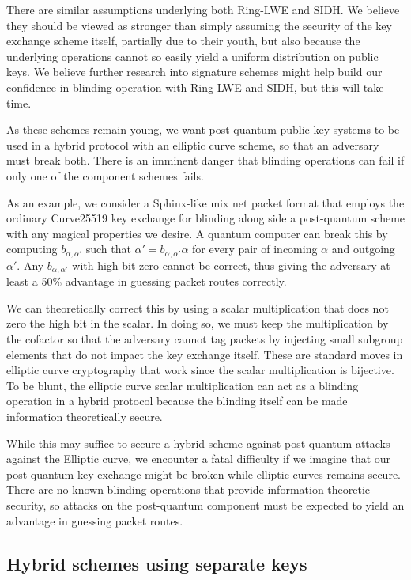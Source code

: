 \documentclass[twoside,letterpaper]{llncs}
\begin{document}
There are similar assumptions underlying both Ring-LWE and SIDH.
We believe they should be viewed as stronger than simply assuming the
security of the key exchange scheme itself, partially due to their
youth, but also because the underlying operations cannot so easily
yield a uniform distribution on public keys.  We believe further
research into signature schemes might help build our confidence in
blinding operation with Ring-LWE and SIDH, but this will take time.

As these schemes remain young, we want post-quantum public key
systems to be used in a hybrid protocol with an elliptic curve scheme,
so that an adversary must break both.  There is an imminent danger
that blinding operations can fail if only one of the component schemes
fails.

As an example, we consider a Sphinx-like mix net packet format that
employs the ordinary Curve25519 key exchange for blinding along side
a post-quantum scheme with any magical properties we desire.  
A quantum computer can break this by computing $b_{\alpha,\alpha'}$
such that $\alpha' = b_{\alpha,\alpha'} \alpha$ for every pair of
incoming $\alpha$ and outgoing $\alpha'$.  Any $b_{\alpha,\alpha'}$
with high bit zero cannot be correct, thus giving the adversary at
least a 50\% advantage in guessing packet routes correctly.

We can theoretically correct this by using a scalar multiplication that does not
zero the high bit in the scalar.  In doing so, we must keep the
multiplication by the cofactor so that the adversary cannot tag
packets by injecting small subgroup elements that do not impact the
key exchange itself.  These are standard moves in elliptic curve 
cryptography that work since the scalar multiplication is bijective.
To be blunt, the elliptic curve scalar multiplication can act as
a blinding operation in a hybrid protocol because the blinding itself
can be made information theoretically secure.

While this may suffice to secure a hybrid scheme against post-quantum
attacks against the Elliptic curve, we encounter a fatal difficulty
if we imagine that our post-quantum key 
exchange might be broken while elliptic curves remains secure.  
There are no known blinding operations that provide information
theoretic security, so attacks on the post-quantum component must be
expected to yield an advantage in guessing packet routes.


\subsection{Hybrid schemes using separate keys}
\end{document}
